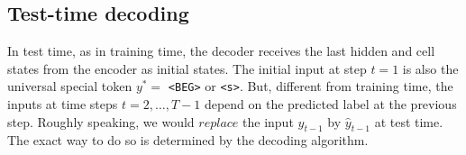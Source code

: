 \documentclass[11pt,a4paper]{article}
\begin{document}





\subsection{Test-time decoding}

In test time, as in training time, the decoder receives the last hidden and cell states from the encoder as initial states. The initial input at step $t = 1$ is also the universal special token $y^* =$ \texttt{<BEG>} or \texttt{<s>}. But, different from training time, the inputs at time steps $t = 2, \dots, T - 1$ depend on the predicted label at the previous step. Roughly speaking, we would $replace$ the input $y_{t-1}$ by $\hat{y}_{t-1}$ at test time. The exact way to do so is determined by the decoding algorithm.
\end{document}
